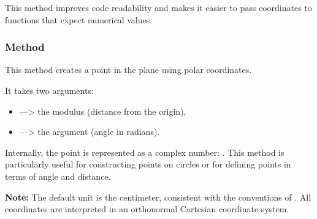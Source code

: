 \noindent
This method improves code readability and makes it easier to pass coordinates to functions that expect numerical values.

\vspace{1em}

\begin{minipage}{.5\textwidth-1cm}
\end{minipage}
\begin{minipage}{.5\textwidth}
\begin{tkzexample}
\end{tkzexample}
\end{minipage}

\subsubsection{Method }
\label{ssub:method_point_polar}

This method creates a point in the plane using polar coordinates.

\medskip
\noindent
It takes two arguments:
\begin{itemize}
  \item {} —> the modulus (distance from the origin),
  \item {} —> the argument (angle in radians).
\end{itemize}

\noindent
Internally, the point is represented as a complex number: . This method is particularly useful for constructing points on circles or for defining points in terms of angle and distance.

\medskip
\noindent
\textbf{Note:} The default unit is the centimeter, consistent with the conventions of . All coordinates are interpreted in an orthonormal Cartesian coordinate system.

